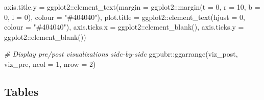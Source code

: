 \documentclass[
]{book}
\newenvironment{Shaded}{\begin{snugshade}}{\end{snugshade}}
\newcommand{\AttributeTok}[1]{\textcolor[rgb]{0.77,0.63,0.00}{#1}}
\newcommand{\CommentTok}[1]{\textcolor[rgb]{0.56,0.35,0.01}{\textit{#1}}}
\newcommand{\DecValTok}[1]{\textcolor[rgb]{0.00,0.00,0.81}{#1}}
\newcommand{\FunctionTok}[1]{\textcolor[rgb]{0.00,0.00,0.00}{#1}}
\newcommand{\NormalTok}[1]{#1}
\newcommand{\SpecialCharTok}[1]{\textcolor[rgb]{0.00,0.00,0.00}{#1}}
\newcommand{\StringTok}[1]{\textcolor[rgb]{0.31,0.60,0.02}{#1}}
\begin{document}
\begin{Shaded}
\begin{Highlighting}[]
                             \AttributeTok{axis.title.y =}\NormalTok{ ggplot2}\SpecialCharTok{::}\FunctionTok{element\_text}\NormalTok{(}\AttributeTok{margin =}\NormalTok{ ggplot2}\SpecialCharTok{::}\FunctionTok{margin}\NormalTok{(}\AttributeTok{t =} \DecValTok{0}\NormalTok{, }\AttributeTok{r =} \DecValTok{10}\NormalTok{, }\AttributeTok{b =} \DecValTok{0}\NormalTok{, }\AttributeTok{l =} \DecValTok{0}\NormalTok{), }\AttributeTok{colour =} \StringTok{"\#404040"}\NormalTok{),}
                             \AttributeTok{plot.title =}\NormalTok{ ggplot2}\SpecialCharTok{::}\FunctionTok{element\_text}\NormalTok{(}\AttributeTok{hjust =} \DecValTok{0}\NormalTok{, }\AttributeTok{colour =} \StringTok{"\#404040"}\NormalTok{),}
                             \AttributeTok{axis.ticks.x =}\NormalTok{ ggplot2}\SpecialCharTok{::}\FunctionTok{element\_blank}\NormalTok{(),}
                             \AttributeTok{axis.ticks.y =}\NormalTok{ ggplot2}\SpecialCharTok{::}\FunctionTok{element\_blank}\NormalTok{())}
  
\CommentTok{\# Display pre/post visualizations side{-}by{-}side}
\NormalTok{ggpubr}\SpecialCharTok{::}\FunctionTok{ggarrange}\NormalTok{(viz\_post, viz\_pre, }\AttributeTok{ncol =} \DecValTok{1}\NormalTok{, }\AttributeTok{nrow =} \DecValTok{2}\NormalTok{)}
\end{Highlighting}
\end{Shaded}

\hypertarget{tables-1}{%
\subsection{Tables}\label{tables-1}}
\end{document}
